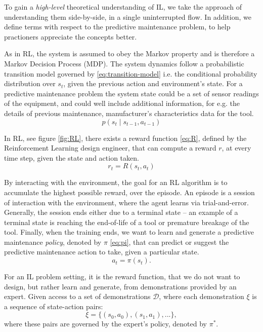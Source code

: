 \documentclass{article}
\begin{document}
To gain a \textit{high-level} theoretical understanding of IL, we take the approach of understanding them side-by-side, in a single uninterrupted flow. In addition, we define terms with respect to the predictive maintenance problem, to help practioners appreciate the concepts better. 

As in RL, the system is assumed to obey the Markov property and is therefore a Markov Decision Process (MDP). The system dynamics follow a probabilistic transition model governed by \eqref{eq:transition-model} i.e. the conditional probability distribution over $s_t$, given the previous action and environment's state. For a predictive maintenance problem the system state could be a set of sensor readings of the equipment, and could well include additional information, for e.g. the details of previous maintenance, manufacturer's characteristics data for the tool.
\begin{equation}\label{eq:transition-model}
	p(s_t \mid s_{t-1}, a_{t-1})
\end{equation}

In RL, see figure \ref{fig:RL}, there exists a reward function \eqref{eq:R}, defined by the Reinforcement Learning design engineer, that can compute a reward $r$, at every time step, given the state and action taken.
\begin{equation}\label{eq:R}
	r_t = R(s_t, a_t)
\end{equation}

By interacting with the environment, the goal for an RL algorithm is to accumulate the highest possible reward, over the episode. An episode is a session of interaction with the environment, where the agent learns via trial-and-error. Generally, the session ends either due to a terminal state -- an example of a terminal state is reaching the end-of-life of a tool or premature breakage of the tool. Finally, when the training ends, we want to learn and generate a predictive maintenance \textit{policy}, denoted by $\pi$ \eqref{eq:pi}, that can predict or suggest the predictive maintenance action to take, given a particular state.
\begin{equation}\label{eq:pi}
	a_t = \pi(s_t).
\end{equation}

For an IL problem setting, it is the reward function, that we do not want to design, but rather learn and generate, from demonstrations provided by an expert. Given access to a set of demonstrations $\mathcal{D}$, where each demonstration $\xi$ is a sequence of state-action pairs:
\begin{equation}\label{eq:demo}
	\xi = \{(s_0, a_0), (s_1, a_1), ...\},
\end{equation}
where these pairs are governed by the expert's policy, denoted by $\pi^{*}$.
\end{document}
